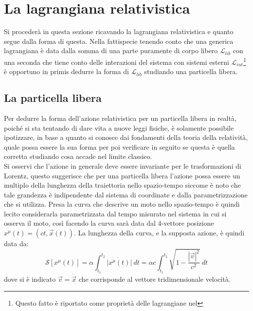 \section{La lagrangiana relativistica}
Si procederà in questa sezione ricavando la lagrangiana relativistica e quanto segue dalla forma di questa. Nella fattispecie tenendo conto che una generica lagrangiana è data dalla somma di una parte puramente di corpo libero $\mathcal{L}_{lib}$ con una seconda che tiene conto delle interazioni del sistema con sistemi esterni $\mathcal{L}_{int}$\footnote{Questo fatto è riportato come proprietà delle lagrangiane nel } è opportuno in primis dedurre la forma di $\mathcal{L}_{lib}$ studiando una particella libera.
\subsection{La particella libera}
Per dedurre la forma dell'azione relativistica per un particella libera in realtà, poiché si sta tentando di dare vita a nuove leggi fisiche, è solamente possibile ipotizzare, in base a quanto si conosce dai fondamenti della teoria della relatività, quale possa essere la sua forma per poi verificare in seguito se questa è quella corretta studiando cosa accade nel limite classico.\\ Si osservi che l'azione in generale deve essere invariante per le trasformazioni di Lorentz, questo suggerisce che per una particella libera l'azione possa essere un multiplo della lunghezza della traiettoria nello spazio-tempo siccome è noto che tale grandezza è indipendente dal sistema di coordinate e dalla parametrizzazione che si utilizza. Presa la curva che descrive un moto nello spazio-tempo è quindi lecito considerarla parametrizzata dal tempo misurato nel sistema in cui si osserva il moto, così facendo la curva sarà data dal 4-vettore posizione $x^\mu(t)=(ct,\vec{x}(t))$. La lunghezza della curva, e la supposta azione, è quindi data da:
\begin{equation}
    \mathcal{S}[x^\mu(t)]=\alpha\int_{t_1}^{t_2} \dot{|x^\mu(t)|}\ dt= \alpha c\int_{t_1}^{t_2} \sqrt{1-\frac{|\vec{v}|^2}{c^2}}\ dt
\end{equation}
dove si è indicato $\vec{v}=\dot{\vec{x}}$ che corrisponde al vettore tridimensionale velocità.\\

